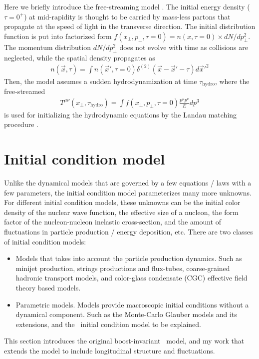 Here we briefly introduce the free-streaming model \cite{Liu:2015nwa}.
The initial energy density ($\tau = 0^+$) at mid-rapidity is thought to be carried by mass-less partons that propagate at the speed of light in the transverse direction. 
The initial distribution function is put into factorized form $f(x_\perp, p_\perp, \tau=0) = n(x, \tau=0) \times dN/dp_\perp^2$.
The momentum distribution $dN/dp_\perp^2$ does not evolve with time as collisions are neglected, while the spatial density propagates as
\begin{eqnarray}
n(\vec{x}, \tau) = \int n(\vec{x}', \tau=0) \delta^{(2)}(\vec{x} - \vec{x}'- \tau) d\vec{x}'^2
\end{eqnarray}
Then, the model assumes a sudden hydrodynamization at time $\tau_{\textrm{hydro}}$, where the free-streamed
\begin{eqnarray}
T^{\mu\nu}(x_\perp, \tau_{\textrm{hydro}}) = \int f(x_\perp, p_\perp, \tau=0) \frac{p^\mu p^\nu}{E} dp^3
\end{eqnarray}
is used for initializing the hydrodynamic equations by the Landau matching procedure \cite{Liu:2015nwa}.

\section{Initial condition model}
Unlike the dynamical models that are governed by a few equations / laws with a few parameters, the initial condition model parameterizes many more unknowns.
For different initial condition models, these unknowns can be the initial color density of the nuclear wave function, the effective size of a nucleon, the form factor of the nucleon-nucleon inelastic cross-section, and the amount of fluctuations in particle production / energy deposition, etc.
There are two classes of initial condition models:
\begin{itemize}
\item Models that takes into account the particle production dynamics. Such as minijet production, strings productions and flux-tubes, coarse-grained hadronic transport models, and color-glass condensate (CGC) effective field theory based models.
\item Parametric models. Models provide macroscopic initial conditions without a dynamical component. Such as the Monte-Carlo Glauber models and its extensions, and the \trento\ initial condition model to be explained.
\end{itemize}
This section introduces the original boost-invariant \trento\ model, and my work that extends the model to include longitudinal structure and fluctuations.

